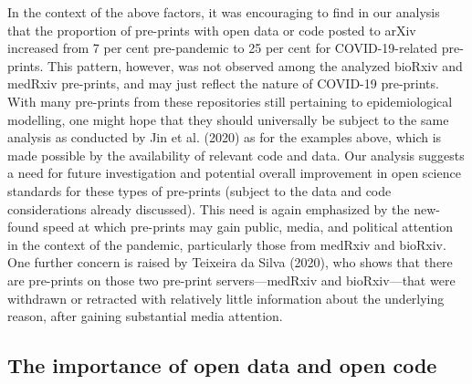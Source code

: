 \documentclass[
]{article}
\begin{document}
In the context of the above factors, it was encouraging to find in our analysis that the proportion of pre-prints with open data or code posted to arXiv increased from 7 per cent pre-pandemic to 25 per cent for COVID-19-related pre-prints. This pattern, however, was not observed among the analyzed bioRxiv and medRxiv pre-prints, and may just reflect the nature of COVID-19 pre-prints. With many pre-prints from these repositories still pertaining to epidemiological modelling, one might hope that they should universally be subject to the same analysis as conducted by Jin et al. (2020) as for the examples above, which is made possible by the availability of relevant code and data. Our analysis suggests a need for future investigation and potential overall improvement in open science standards for these types of pre-prints (subject to the data and code considerations already discussed). This need is again emphasized by the new-found speed at which pre-prints may gain public, media, and political attention in the context of the pandemic, particularly those from medRxiv and bioRxiv. One further concern is raised by Teixeira da Silva (2020), who shows that there are pre-prints on those two pre-print servers---medRxiv and bioRxiv---that were withdrawn or retracted with relatively little information about the underlying reason, after gaining substantial media attention.

\hypertarget{the-importance-of-open-data-and-open-code}{%
\subsection{The importance of open data and open code}\label{the-importance-of-open-data-and-open-code}}
\end{document}

